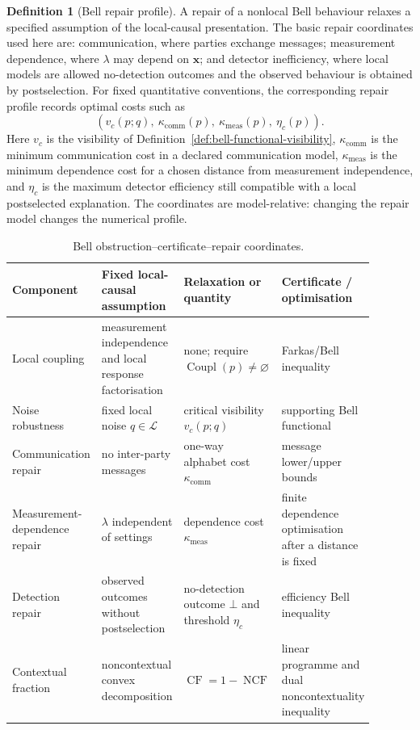 \documentclass[11pt]{article}
\theoremstyle{plain}
\theoremstyle{definition}
\newtheorem{definition}[theorem]{Definition}
\theoremstyle{remark}
\begin{document}
\begin{definition}[Bell repair profile]
\label{def:bell-repair-profile}
A repair of a nonlocal Bell behaviour relaxes a specified assumption of the
local-causal presentation. The basic repair coordinates used here are:
communication, where parties exchange messages; measurement dependence, where
\(\lambda\) may depend on \(\mathbf x\); and detector inefficiency, where local
models are allowed no-detection outcomes and the observed behaviour is obtained
by postselection. For fixed quantitative conventions, the corresponding repair
profile records optimal costs such as
\[
(v_c(p;q),\ \kappa_{\mathrm{comm}}(p),\ \kappa_{\mathrm{meas}}(p),\ \eta_c(p)).
\]
Here \(v_c\) is the visibility of Definition~\ref{def:bell-functional-visibility},
\(\kappa_{\mathrm{comm}}\) is the minimum communication cost in a declared
communication model, \(\kappa_{\mathrm{meas}}\) is the minimum dependence cost for
a chosen distance from measurement independence, and \(\eta_c\) is the maximum
detector efficiency still compatible with a local postselected explanation. The
coordinates are model-relative: changing the repair model changes the numerical
profile.
\end{definition}

\begin{table}[htbp]
\centering
\caption{Bell obstruction--certificate--repair coordinates.}
\label{tab:bell-repair}
\begin{tabular}{@{}p{0.18\linewidth}p{0.25\linewidth}p{0.22\linewidth}p{0.24\linewidth}@{}}
\toprule
Component & Fixed local-causal assumption & Relaxation or quantity & Certificate / optimisation\\
\midrule
Local coupling & measurement independence and local response factorisation &
none; require $\operatorname{Coupl}(p)\ne\varnothing$ & Farkas/Bell inequality\\
Noise robustness & fixed local noise $q\in\mathcal L$ & critical visibility
$v_c(p;q)$ & supporting Bell functional\\
Communication repair & no inter-party messages & one-way alphabet cost
$\kappa_{\mathrm{comm}}$ & message lower/upper bounds\\
Measurement-dependence repair & $\lambda$ independent of settings & dependence
cost $\kappa_{\mathrm{meas}}$ & finite dependence optimisation after a distance is fixed\\
Detection repair & observed outcomes without postselection & no-detection
outcome $\bot$ and threshold $\eta_c$ & efficiency Bell inequality\\
Contextual fraction & noncontextual convex decomposition &
$\operatorname{CF}=1-\operatorname{NCF}$ & linear programme and dual noncontextuality inequality\\
\bottomrule
\end{tabular}
\end{table}
\end{document}

